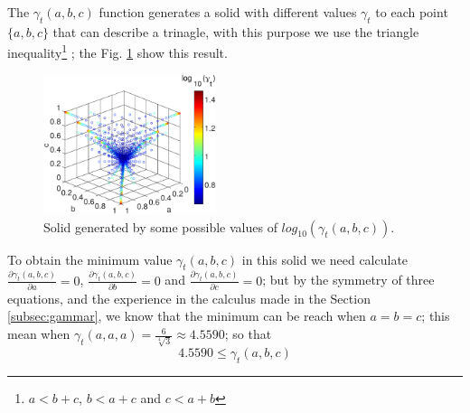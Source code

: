 The $\gamma_t(a,b,c)$ function generates a solid with different values $\gamma_t$ to each point $\{a,b,c\}$
that can describe a trinagle, with this purpose we use the  triangle 
inequality\footnote{$a < b+c$, $b < a+c$ and $c < a+b$} \cite[pp. 17]{ross1980elementary};
the Fig. \ref{fig:section1-gammat} show this result.
\begin{figure}[h!]
\centering
\includegraphics[width=0.45\textwidth]{section1-gammat.eps}
\caption{Solid generated by some possible values of $log_{10}(\gamma_t(a,b,c))$.}
\label{fig:section1-gammat}
\end{figure}

To obtain the minimum value $\gamma_t(a,b,c)$ in this solid we need 
calculate $\frac{\partial \gamma_t(a,b,c)}{\partial a}=0$,
$\frac{\partial \gamma_t(a,b,c)}{\partial b}=0$
and $\frac{\partial \gamma_t(a,b,c)}{\partial c}=0$;
but by the symmetry of three equations, 
and the experience in the calculus made in the Section \ref{subsec:gammar},
we know that the minimum can be reach when $a=b=c$;
this mean when $\gamma_t(a,a,a)=\frac{6}{\sqrt[4]{3}}\approx 4.5590$; so that
\begin{equation}
4.5590 \leq \gamma_t(a,b,c) 
\end{equation}

